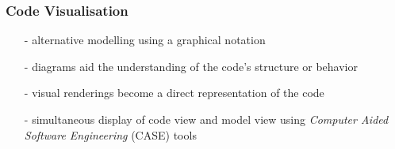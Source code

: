 %
%
%
%
%
%
%

\subsubsection{Code Visualisation}
\label{code_visualisation_heading}

\begin{itemize}
    \item[-] alternative modelling using a graphical notation
    \item[-] diagrams aid the understanding of the code's structure or behavior
    \item[-] visual renderings become a direct representation of the code
    \item[-] simultaneous display of code view and model view using
        \emph{Computer Aided Software Engineering} (CASE) tools
\end{itemize}
